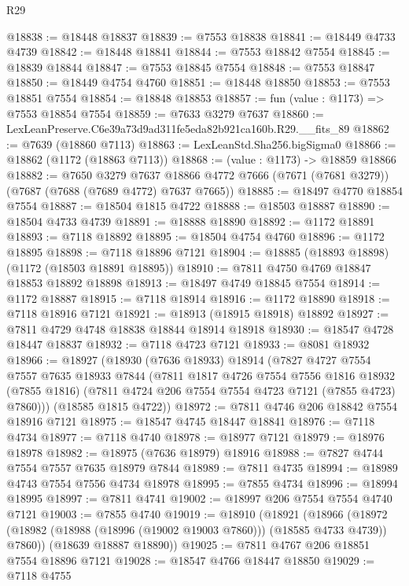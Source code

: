\begin{lexlean}{R29}
\begin{coremodule}
@18838 := @18448 @18837
@18839 := @7553 @18838
@18841 := @18449 @4733 @4739
@18842 := @18448 @18841
@18844 := @7553 @18842 @7554
@18845 := @18839 @18844
@18847 := @7553 @18845 @7554
@18848 := @7553 @18847
@18850 := @18449 @4754 @4760
@18851 := @18448 @18850
@18853 := @7553 @18851 @7554
@18854 := @18848 @18853
@18857 := fun (value : @1173) => @7553 @18854 @7554
@18859 := @7633 @3279 @7637
@18860 := LexLeanPreserve.C6e39a73d9ad311fe5eda82b921ca160b.R29.__fits_89
@18862 := @7639 (@18860 @7113)
@18863 := LexLeanStd.Sha256.bigSigma0
@18866 := @18862 (@1172 (@18863 @7113))
@18868 := (value : @1173) -> @18859 @18866
@18882 := @7650
    @3279
    @7637
    @18866
    @4772
    @7666
    (@7671 (@7681 @3279))
    (@7687 (@7688 (@7689 @4772) @7637 @7665))
@18885 := @18497 @4770 @18854 @7554
@18887 := @18504 @1815 @4722
@18888 := @18503 @18887
@18890 := @18504 @4733 @4739
@18891 := @18888 @18890
@18892 := @1172 @18891
@18893 := @7118 @18892
@18895 := @18504 @4754 @4760
@18896 := @1172 @18895
@18898 := @7118 @18896 @7121
@18904 := @18885 (@18893 @18898) (@1172 (@18503 @18891 @18895))
@18910 := @7811 @4750 @4769 @18847 @18853 @18892 @18898
@18913 := @18497 @4749 @18845 @7554
@18914 := @1172 @18887
@18915 := @7118 @18914
@18916 := @1172 @18890
@18918 := @7118 @18916 @7121
@18921 := @18913 (@18915 @18918) @18892
@18927 := @7811 @4729 @4748 @18838 @18844 @18914 @18918
@18930 := @18547 @4728 @18447 @18837
@18932 := @7118 @4723 @7121
@18933 := @8081 @18932
@18966 := @18927
    (@18930
      (@7636 @18933)
      @18914
      (@7827
        @4727
        @7554
        @7557
        @7635
        @18933
        @7844
        (@7811
          @1817
          @4726
          @7554
          @7556
          @1816
          @18932
          (@7855 @1816)
          (@7811 @4724 @206 @7554 @7554 @4723 @7121 (@7855 @4723) @7860)))
      (@18585 @1815 @4722))
@18972 := @7811 @4746 @206 @18842 @7554 @18916 @7121
@18975 := @18547 @4745 @18447 @18841
@18976 := @7118 @4734
@18977 := @7118 @4740
@18978 := @18977 @7121
@18979 := @18976 @18978
@18982 := @18975 (@7636 @18979) @18916
@18988 := @7827 @4744 @7554 @7557 @7635 @18979 @7844
@18989 := @7811 @4735
@18994 := @18989 @4743 @7554 @7556 @4734 @18978
@18995 := @7855 @4734
@18996 := @18994 @18995
@18997 := @7811 @4741
@19002 := @18997 @206 @7554 @7554 @4740 @7121
@19003 := @7855 @4740
@19019 := @18910
    (@18921
      (@18966 (@18972 (@18982 (@18988 (@18996 (@19002 @19003 @7860))) (@18585 @4733 @4739)) @7860))
      (@18639 @18887 @18890))
@19025 := @7811 @4767 @206 @18851 @7554 @18896 @7121
@19028 := @18547 @4766 @18447 @18850
@19029 := @7118 @4755

\end{coremodule}
\end{lexlean}
